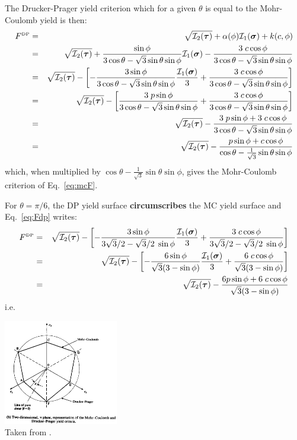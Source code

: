 The Drucker-Prager yield criterion which for a given $\theta$ is equal to the Mohr-Coulomb yield is then:
\begin{eqnarray}
F^{\text{\tiny DP}}
&=& \sqrt{{\cal I}_2({\bm \tau})} + \alpha(\phi) {\cal I}_1({\bm \sigma}) + k(c,\phi)  \nonumber\\
&=& \sqrt{{\cal I}_2({\bm \tau})} 
+ \frac{\sin\phi}{ 3 \cos\theta - \sqrt{3}\sin\theta \sin\phi}  {\cal I}_1({\bm \sigma})  
- \frac{ 3\; c \cos \phi }{ 3 \cos\theta - \sqrt{3}\sin\theta \sin\phi} \nonumber\\
&=& \sqrt{{\cal I}_2({\bm \tau})} 
- \left[ -\frac{3 \sin\phi}{ 3 \cos\theta - \sqrt{3}\sin\theta \sin\phi}  \frac{{\cal I}_1({\bm \sigma})}{3}
+ \frac{ 3\; c \cos \phi }{ 3 \cos\theta - \sqrt{3}\sin\theta \sin\phi} \right] \label{eq:Fdp}\\
&=& \sqrt{{\cal I}_2({\bm \tau})} 
- \left[ \frac{3\; p \sin\phi}{ 3 \cos\theta - \sqrt{3}\sin\theta \sin\phi} 
+ \frac{ 3\; c \cos \phi }{ 3 \cos\theta - \sqrt{3}\sin\theta \sin\phi} \right] \nonumber\\
&=& \sqrt{{\cal I}_2({\bm \tau})}  
- \frac{3\; p \sin\phi  + 3\; c \cos \phi }{ 3 \cos\theta - \sqrt{3}\sin\theta \sin\phi} \nonumber\\ 
&=& \sqrt{{\cal I}_2({\bm \tau})}  
- \frac{p \sin\phi  + c \cos \phi }{  \cos\theta - \frac{1}{\sqrt{3}}\sin\theta \sin\phi} 
\end{eqnarray}
which, when multiplied by $\cos\theta - \frac{1}{\sqrt{3}}\sin\theta \sin\phi$, gives
the Mohr-Coulomb criterion of Eq.~\eqref{eq:mcF}. 

For $\theta=\pi/6$, the DP yield surface {\bf circumscribes} the MC yield 
surface and Eq.~\eqref{eq:Fdp} writes:
\begin{eqnarray}
F^{\text{\tiny DP}}
&=& \sqrt{{\cal I}_2({\bm \tau})} 
- \left[ -\frac{3 \sin\phi}{ 3 \sqrt{3}/2 - \sqrt{3}/2 \; \sin\phi}  \frac{{\cal I}_1({\bm \sigma})}{3}
+ \frac{ 3\; c \cos \phi }{ 3 \sqrt{3}/2 - \sqrt{3}/2 \; \sin\phi} \right] \nonumber\\
&=& \sqrt{{\cal I}_2({\bm \tau})} 
- \left[ -\frac{6 \sin\phi}{\sqrt{3} (3 - \sin\phi) }  \frac{{\cal I}_1({\bm \sigma})}{3}
+ \frac{ 6\; c \cos \phi }{ \sqrt{3}(3 - \sin\phi)} \right] \nonumber\\
&=& \sqrt{{\cal I}_2({\bm \tau})} 
- \frac{ 6 p \sin \phi + 6\; c \cos \phi }{ \sqrt{3}(3 - \sin\phi)} \label{eq:dpc}
\end{eqnarray}
i.e.

\begin{center}
\includegraphics[width=5cm]{images/rheology/owenhinton6}\\
{\captionfont Taken from \textcite{owhi}.}
\end{center}

